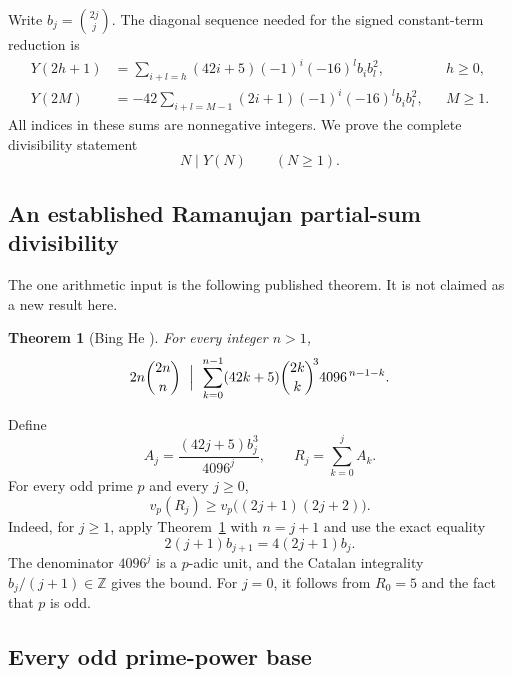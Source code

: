\documentclass[11pt,a4paper]{article}
\numberwithin{equation}{section}
\newtheorem{theorem}{Theorem}[section]
\theoremstyle{remark}
\begin{document}
Write \(b_j=\binom{2j}{j}\). The diagonal sequence needed for the
signed constant-term reduction is
\begin{align}
 Y(2h+1)
   &=\sum_{i+l=h}(42i+5)(-1)^i(-16)^l b_i b_l^2,
       &&h\ge0,\label{s57:odd-diagonal}\\
 Y(2M)
   &=-42\sum_{i+l=M-1}(2i+1)(-1)^i(-16)^l b_i b_l^2,
       &&M\ge1.\label{s57:even-diagonal}
\end{align}
All indices in these sums are nonnegative integers.
We prove the complete divisibility statement
\[
                         N\mid Y(N)\qquad(N\ge1).
\]

\subsection{An established Ramanujan partial-sum divisibility}

The one arithmetic input is the following published theorem. It is
not claimed as a new result here.

\begin{theorem}[Bing He \cite{He2017}]
\label{s57:he-input}
For every integer \(n>1\),
\[
 2n\binom{2n}{n}\ \Bigm|\
 \sum_{k=0}^{n-1}(42k+5)\binom{2k}{k}^{\!3}4096^{\,n-1-k}.
\]
\end{theorem}

Define
\[
 A_j=\frac{(42j+5)b_j^3}{4096^j},\qquad
 R_j=\sum_{k=0}^j A_k.
\]
For every odd prime \(p\) and every \(j\ge0\),
\begin{equation}
 v_p(R_j)\ge v_p\bigl((2j+1)(2j+2)\bigr).
 \label{s57:partial-bound}
\end{equation}
Indeed, for \(j\ge1\), apply Theorem~\ref{s57:he-input} with
\(n=j+1\) and use the exact equality
\[
 2(j+1)b_{j+1}=4(2j+1)b_j.
\]
The denominator \(4096^j\) is a \(p\)-adic unit, and the Catalan
integrality \(b_j/(j+1)\in\mathbb Z\) gives the bound.
For \(j=0\), it follows from \(R_0=5\) and the fact that \(p\) is odd.

\subsection{Every odd prime-power base}
\end{document}
